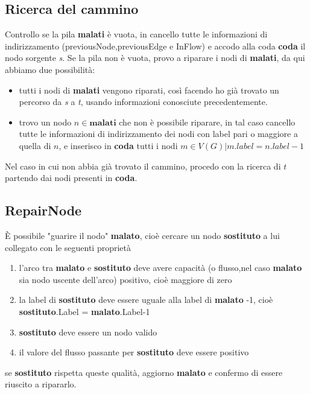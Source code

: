 \documentclass{article}
\begin{document}
\subsection{Ricerca del cammino}
Controllo se la pila \textbf{malati} è vuota, in cancello tutte le informazioni di indirizzamento (previousNode,previousEdge e InFlow) e accodo alla coda \textbf{coda} il nodo sorgente \textit{s}.
Se la pila non è vuota, provo a riparare i nodi di \textbf{malati}, da qui abbiamo due possibilità:
\begin{itemize}
    \item tutti i nodi di \textbf{malati} vengono riparati, così facendo ho già trovato un percorso da \textit{s} a \textit{t}, usando informazioni conosciute precedentemente.
    \item trovo un nodo $n \in  \textbf{malati}$ che non è possibile riparare, in tal caso cancello tutte le informazioni di indirizzamento dei nodi con label pari o maggiore a quella di $n$, e inserisco in \textbf{coda} tutti i nodi $m \in V(G) | m.label = n.label-1$
\end{itemize}
Nel caso in cui non abbia già trovato il cammino, procedo con la ricerca di $t$ partendo dai nodi presenti in \textbf{coda}.

\subsection{RepairNode}

È possibile "guarire il nodo" \textbf{malato}, cioè cercare un nodo \textbf{sostituto} a lui collegato con le seguenti proprietà
\begin{enumerate}
    \item l'arco tra \textbf{malato} e \textbf{sostituto} deve avere capacità (o flusso,nel caso \textbf{malato} sia nodo uscente dell'arco) positivo, cioè maggiore di zero
    \item la label di \textbf{sostituto} deve essere uguale alla label di \textbf{malato} -1, cioè
          \textbf{sostituto}.Label = \textbf{malato}.Label-1
    \item \textbf{sostituto} deve essere un nodo valido
    \item il valore del flusso passante per \textbf{sostituto} deve essere positivo
\end{enumerate}
se \textbf{sostituto} rispetta queste qualità, aggiorno \textbf{malato} e confermo di essere riuscito a ripararlo.
\end{document}
